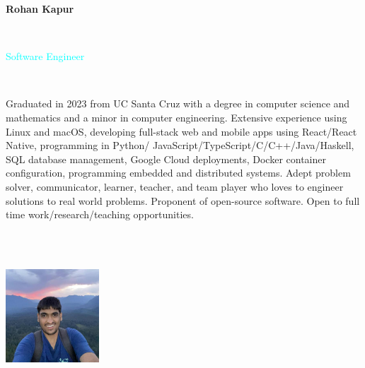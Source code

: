 \documentclass[letterpaper,10pt]{article}
\begin{document}
\fontsize{9pt}{\baselineskip}\selectfont

\begin{multicols}{3}
  \begin{huge} \noindent\textbf{Rohan Kapur} \end{huge} \\
  \begin{Large} \textcolor{cyan}{Software Engineer} \end{Large}
  \vspace{.5em} \\
  \begin{minipage}{.5\textwidth}
    \begin{flushleft}
      Graduated in 2023 from UC Santa Cruz with a degree in computer science and mathematics and a minor in computer engineering. Extensive experience using Linux and macOS, developing full-stack web and mobile apps using React/React Native, programming in Python/
      JavaScript/TypeScript/C/C++/Java/Haskell, SQL database management, Google Cloud deployments, Docker container configuration, programming embedded and distributed systems. Adept problem solver, communicator, learner, teacher, and team player who loves to engineer solutions to real world problems. Proponent of open-source software. Open to full time work/research/teaching opportunities.
    \end{flushleft}
  \end{minipage}
  \columnbreak \\
  \vspace{3em} \\
  \begin{minipage}{.33\textwidth}
    \hspace{11.6em}
    \includegraphics*[width=3.5cm,height=3.5cm]{images/ProfilePicture.jpg}
  \end{minipage}
  \columnbreak \\
  \vspace{3em} \\
  \begin{minipage}{.33\textwidth}
    \begin{flushright}

\end{flushright}
\end{minipage}
\end{multicols}
\end{document}
